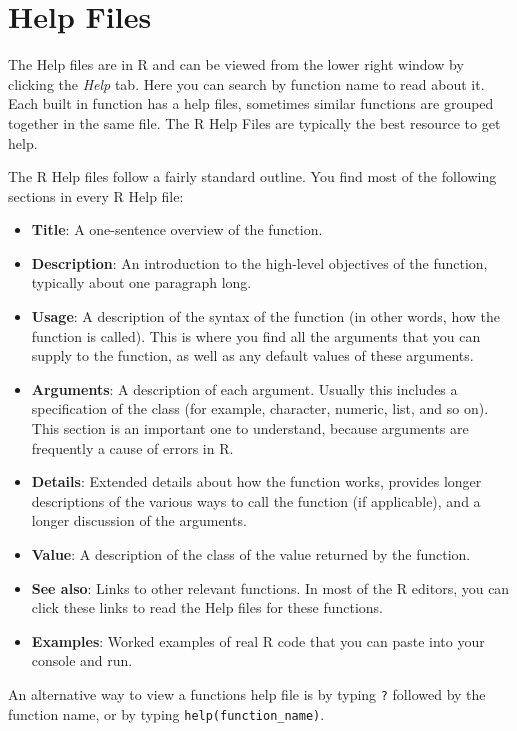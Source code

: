 \documentclass[
]{book}
\begin{document}
\hypertarget{help-files}{%
\section{Help Files}\label{help-files}}

The Help files are in R and can be viewed from the lower right window by clicking the \emph{Help} tab. Here you can search by function name to read about it. Each built in function has a help files, sometimes similar functions are grouped together in the same file. The R Help Files are typically the best resource to get help.

The R Help files follow a fairly standard outline. You find most of the following sections in every R Help file:

\begin{itemize}
\item
  \textbf{Title}: A one-sentence overview of the function.
\item
  \textbf{Description}: An introduction to the high-level objectives of the function, typically about one paragraph long.
\item
  \textbf{Usage}: A description of the syntax of the function (in other words, how the function is called). This is where you find all the arguments that you can supply to the function, as well as any default values of these arguments.
\item
  \textbf{Arguments}: A description of each argument. Usually this includes a specification of the class (for example, character, numeric, list, and so on). This section is an important one to understand, because arguments are frequently a cause of errors in R.
\item
  \textbf{Details}: Extended details about how the function works, provides longer descriptions of the various ways to call the function (if applicable), and a longer discussion of the arguments.
\item
  \textbf{Value}: A description of the class of the value returned by the function.
\item
  \textbf{See also}: Links to other relevant functions. In most of the R editors, you can click these links to read the Help files for these functions.
\item
  \textbf{Examples}: Worked examples of real R code that you can paste into your console and run.
\end{itemize}

An alternative way to view a functions help file is by typing \texttt{?} followed by the function name, or by typing \texttt{help(function\_name)}.
\end{document}
